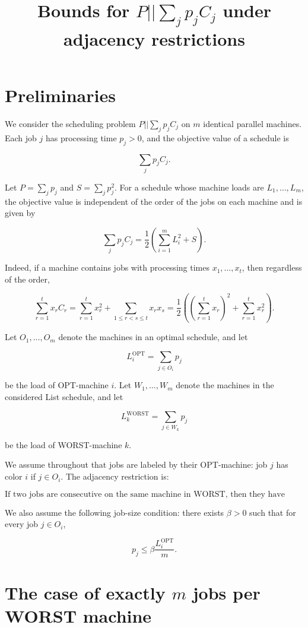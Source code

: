 \documentclass[11pt]{article}
\newcommand{\OPT}{\mathrm{OPT}}
\newcommand{\WORST}{\mathrm{WORST}}
\begin{document}
\title{Bounds for \(P||\sum_j p_j C_j\) under adjacency restrictions}
\author{}
\date{}
\maketitle

\section{Preliminaries}

We consider the scheduling problem \(P||\sum_j p_j C_j\) on \(m\) identical parallel machines.  
Each job \(j\) has processing time \(p_j>0\), and the objective value of a schedule is

\[
\sum_j p_j C_j .
\]

Let \(P=\sum_j p_j\) and \(S=\sum_j p_j^2\). For a schedule whose machine loads are
\(L_1,\dots,L_m\), the objective value is independent of the order of the jobs on each
machine and is given by

\[
\sum_j p_j C_j
=
\frac12\left(\sum_{i=1}^m L_i^2+S\right).
\]

Indeed, if a machine contains jobs with processing times \(x_1,\dots,x_t\), then regardless
of the order,

\[
\sum_{r=1}^t x_r C_r
=
\sum_{r=1}^t x_r^2+\sum_{1\le r<s\le t}x_r x_s
=
\frac12\left(\left(\sum_{r=1}^t x_r\right)^2+\sum_{r=1}^t x_r^2\right).
\]

Let \(O_1,\dots,O_m\) denote the machines in an optimal schedule, and let

\[
L_i^{\OPT}=\sum_{j\in O_i}p_j
\]

be the load of OPT-machine \(i\). Let \(W_1,\dots,W_m\) denote the machines in the
considered List schedule, and let

\[
L_k^{\WORST}=\sum_{j\in W_k}p_j
\]

be the load of WORST-machine \(k\).

We assume throughout that jobs are labeled by their OPT-machine: job \(j\) has color \(i\)
if \(j\in O_i\). The adjacency restriction is:

\[
\text{If two jobs are consecutive on the same machine in WORST, then they have different OPT-colors.}
\]

We also assume the following job-size condition: there exists \(\beta>0\) such that for every
job \(j\in O_i\),

\[
p_j\le \beta \frac{L_i^{\OPT}}{m}.
\]

\section{The case of exactly \(m\) jobs per WORST machine}
\end{document}
